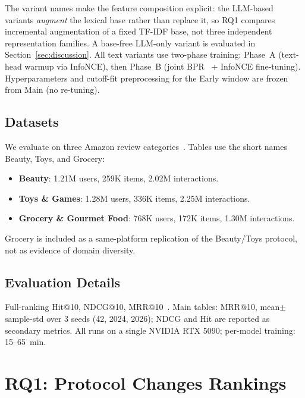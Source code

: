 \documentclass[sigconf,natbib=true,anonymous]{acmart}
\newcommand{\tfidf}{\textsc{TF-IDF}\xspace}
\begin{document}
The variant names make the feature composition explicit: the LLM-based variants \emph{augment} the lexical base rather than replace it, so RQ1 compares incremental augmentation of a fixed \tfidf base, not three independent representation families.
A base-free LLM-only variant is evaluated in Section~\ref{sec:discussion}.
All text variants use two-phase training: Phase~A (text-head warmup via InfoNCE), then Phase~B (joint BPR~\cite{rendle2009bpr} + InfoNCE fine-tuning).
Hyperparameters and cutoff-fit preprocessing for the Early window are frozen from Main (no re-tuning).

\subsection{Datasets}

We evaluate on three Amazon review categories~\cite{mcauley2015amazon,ni2019amazon}.
Tables use the short names Beauty, Toys, and Grocery:
\begin{itemize}[leftmargin=*,itemsep=1pt]
\item \textbf{Beauty}: 1.21M users, 259K items, 2.02M interactions.
\item \textbf{Toys \& Games}: 1.28M users, 336K items, 2.25M interactions.
\item \textbf{Grocery \& Gourmet Food}: 768K users, 172K items, 1.30M interactions.
\end{itemize}
Grocery is included as a same-platform replication of the Beauty/\hspace{0pt}Toys protocol, not as evidence of domain diversity.

\subsection{Evaluation Details}

Full-ranking Hit@10, NDCG@10, MRR@10~\cite{krichene2020sampledmetrics}.
Main tables: MRR@10, mean$\pm$sample-std over 3 seeds (42, 2024, 2026); NDCG and Hit are reported as secondary metrics.
All runs on a single NVIDIA RTX 5090; per-model training: 15--65~min.

\section{RQ1: Protocol Changes Rankings}
\label{sec:rq1}
\end{document}
